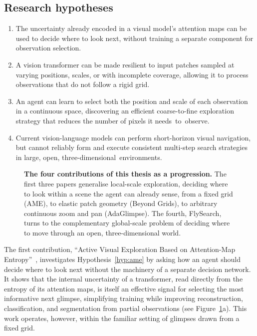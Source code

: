 \subsection{Research hypotheses}
\label{subsec:research-hypotheses}

\begin{enumerate}[label=\textbf{H\arabic*.},ref=H\arabic*]
    \item \label{hyp:ame} The uncertainty already encoded in a visual model's attention maps can be used to decide where to look next, without training a separate component for observation selection.
    \item \label{hyp:beyond} A vision transformer can be made resilient to input patches sampled at varying positions, scales, or with incomplete coverage, allowing it to process observations that do not follow a rigid grid.
    \item \label{hyp:adaglimpse} An agent can learn to select both the position and scale of each observation in a continuous space, discovering an efficient coarse-to-fine exploration strategy that reduces the number of pixels it needs~to~observe.
    \item {\raggedright \label{hyp:flysearch} Current vision-language models can perform short-horizon visual navigation, but cannot reliably form and execute consistent multi-step search strategies in large, open, \mbox{three-dimensional environments}.\par}
\end{enumerate}

\begin{figure}[t]
\centering

\caption[The four contributions of this thesis]{\textbf{The four contributions of this thesis as a progression.} The first three papers generalise local-scale exploration, deciding where to look within a scene the agent can already sense, from a fixed grid (AME), to elastic patch geometry (Beyond Grids), to arbitrary continuous zoom and pan (AdaGlimpse). The fourth, FlySearch, turns to the complementary global-scale problem of deciding where to move through an open, three-dimensional world.}
\label{fig:contributions}
\end{figure}

The first contribution, ``Active Visual Exploration Based on Attention-Map Entropy''~, investigates Hypothesis~\ref{hyp:ame} by asking how an agent should decide where to look
next without the machinery of a separate decision network. It shows that the internal uncertainty of a transformer, read directly from the entropy of its
attention maps, is itself an effective signal for selecting the most informative next glimpse, simplifying training while improving reconstruction,
classification, and segmentation from partial observations (see Figure~\ref{fig:contributions}a). This work operates, however, within the familiar setting of glimpses drawn from a fixed grid.

